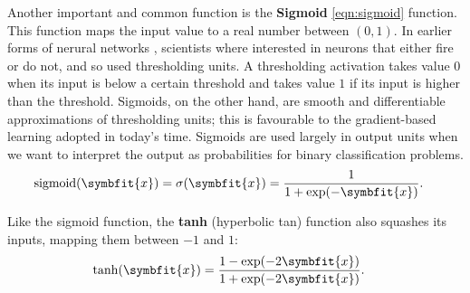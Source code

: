 Another important and common function is the \textbf{Sigmoid} \cref{eqn:sigmoid} function. This function maps the input value to a real number between $(0, 1)$.
In earlier forms of nerural networks \parencite{mcculloch1943logical}, scientists where interested in neurons that either fire or do not, and so used thresholding units. A thresholding activation takes value $0$ when its input is below a certain threshold and takes value $1$ if its input is higher than the threshold. 
Sigmoids, on the other hand, are smooth and differentiable approximations of thresholding units; this is favourable to the gradient-based learning adopted in today's time.
Sigmoids are used largely in output units when we want to interpret the output as probabilities for binary classification problems.
\begin{equation}\label{eqn:sigmoid}
    \begin{split}
        \operatorname{sigmoid}(\symbfit{x}) = \sigma(\symbfit{x}) & = \frac{1}{1 + \exp(-\symbfit{x})}.
    \end{split}
\end{equation}

Like the sigmoid function, the \textbf{tanh} (hyperbolic tan) function also squashes its inputs, mapping them between $-1$ and $1$:
\begin{equation}
\begin{split}
    \operatorname{tanh}(\symbfit{x}) & = \frac{1 - \exp(-2\symbfit{x})}{1 + \exp(-2\symbfit{x})}.
\end{split}
\end{equation}


